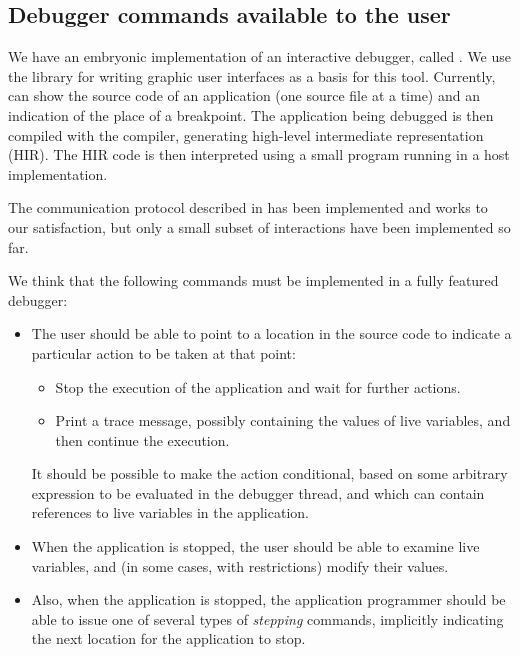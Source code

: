 \subsection{Debugger commands available to the user}

We have an embryonic implementation of an interactive debugger, called
\clordane{}.  We use the \mcclim{} library for writing graphic user
interfaces as a basis for this tool.  Currently, \clordane{} can show
the source code of an application (one source file at a time) and an
indication of the place of a breakpoint.  The application being
debugged is then compiled with the \sicl{} compiler, generating
high-level intermediate representation (HIR).  The HIR code is then
interpreted using a small program running in a host \commonlisp{}
implementation.

The communication protocol described in
 has been implemented
and works to our satisfaction, but only a small subset of interactions
have been implemented so far.

We think that the following commands must be implemented in a fully
featured debugger:

\begin{itemize}
\item The user should be able to point to a location
  in the source code to indicate a particular action to be taken at
  that point:
  \begin{itemize}
  \item Stop the execution of the application and wait for further
    actions.
  \item Print a trace message, possibly containing the values of live
    variables, and then continue the execution. 
  \end{itemize}
  It should be possible to make the action conditional, based on some
  arbitrary expression to be evaluated in the debugger thread, and
  which can contain references to live variables in the application.
\item When the application is stopped, the user
  should be able to examine live variables, and (in some cases, with
  restrictions) modify their values.
\item Also, when the application is stopped, the application
  programmer should be able to issue one of several types of
  \emph{stepping} commands, implicitly indicating the next location
  for the application to stop.
\end{itemize}
